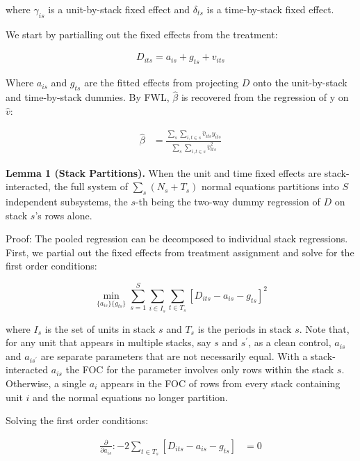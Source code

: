 \documentclass[12pt]{article}
\begin{document}
where $\gamma_{is}$ is a unit-by-stack fixed effect and $\delta_{ts}$ is a time-by-stack fixed effect. 

We start by partialling out the fixed effects from the treatment:

\begin{align*}
    D_{its} = a_{is} + g_{ts} + v_{its}
\end{align*}

Where $a_{is}$ and $g_{ts}$ are the fitted effects from projecting $D$ onto the unit-by-stack and time-by-stack dummies. By FWL, $\hat{\beta}$ is recovered from the regression of y on $\hat{v}$:

\begin{align*}
    \hat{\beta} &= \frac{\sum_s \sum_{i,t\in s} \hat{v}_{its} y_{its}}{\sum_s \sum_{i,t\in s} \hat{v}^2_{its}}
\end{align*}

\textbf{Lemma 1 (Stack Partitions).} When the unit and time fixed effects are stack-interacted, the full system of $\sum_s (N_s + T_s)$ normal equations partitions into $S$ independent subsystems, the $s$-th being the two-way dummy regression of $D$ on stack $s$'s rows alone.

Proof: The pooled regression can be decomposed to individual stack regressions. First, we partial out the fixed effects from treatment assignment and solve for the first order conditions:

\begin{equation*}
    \min_{\{a_{is}\}\{g_{ts}\}} \sum_{s=1}^S \sum_{i \in I_s} \sum_{t \in  T_s}[D_{its} - a_{is} - g_{ts}]^2
\end{equation*}

where $I_s$ is the set of units in stack $s$ and $T_s$ is the periods in stack $s$. Note that, for any unit that appears in multiple stacks, say $s$ and $s^\prime$, as a clean control, $a_{is}$ and $ a_{is^\prime}$ are separate parameters that are not necessarily equal. With a stack-interacted $a_{is}$ the FOC for the parameter involves only rows within the stack $s$. Otherwise, a single $a_i$ appears in the FOC of rows from every stack containing unit $i$ and the normal equations no longer partition.

Solving the first order conditions:

\begin{align*}
    \frac{\partial}{\partial a_{is}} : -2 \sum_{t \in  T_s}[D_{its} - a_{is} - g_{ts}] &= 0
\end{align*}
\end{document}
